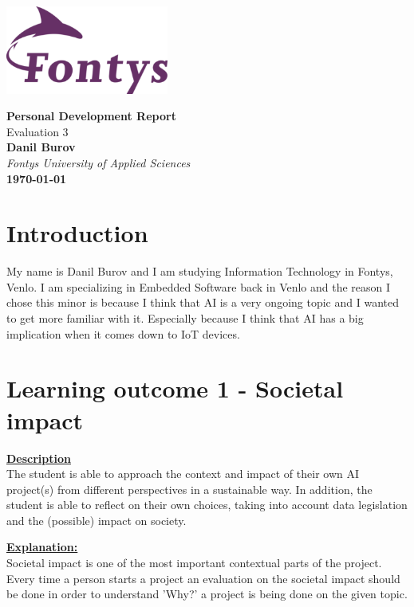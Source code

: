 \documentclass{article}
\begin{document}
	
	\begin{titlepage}
		\centering
		\vspace*{3cm}
		
		\includegraphics[width=0.4\textwidth]{images/fontyslogo.png} %
		\vspace{1.5cm}
		
		{\Huge\bfseries Personal Development Report}\\[1cm]
		{\LARGE Evaluation 3}\\[2cm]
		
		\textbf{Danil Burov}\\
		\vspace{0.5cm}
		\textit{Fontys University of Applied Sciences}\\[3cm]
		\vfill
		\textbf{\today}
		
	\end{titlepage}
	\newpage
	\tableofcontents
	\newpage
	
	\section{Introduction}
	My name is Danil Burov and I am studying Information Technology in Fontys, Venlo. I am specializing in 
	Embedded Software back in Venlo and the reason I chose this minor is because I think that AI is a very 
	ongoing topic and I wanted to get more familiar with it. Especially because I think that AI has a big 
	implication when it comes down to IoT devices.
	
	\section{Learning outcome 1 - Societal impact}
	\underline{\textbf{Description}}\\
	The student is able to approach the context and impact of their own AI project(s) 
	from different perspectives in a sustainable way. In addition, the student is able to 
	reflect on their own choices, taking into account data legislation and the (possible) impact on society.
	
	\underline{\textbf{Explanation:}}\\
	Societal impact is one of the most important contextual parts of the project. Every time a person 
	starts a project an evaluation on the societal impact should be done in order to understand 'Why?'
	a project is being done on the given topic.
	
\end{document}
